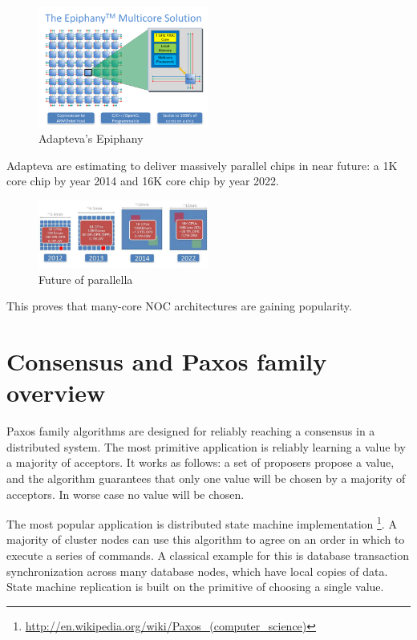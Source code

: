\documentclass[english,11pt]{l4proj}
\begin{document}
\begin{figure}
    \centering
    \includegraphics[width=0.5\textwidth]{images/parallella_64core.png}
    \caption{Adapteva's Epiphany\cite{parallella-kickstarter}}
    \label{fig:epiphany_64}
\end{figure}

Adapteva are estimating to deliver massively parallel chips in near future: a 1K
core chip by year 2014 and 16K core chip by year 2022.

\begin{figure}
    \centering
    \includegraphics[width=0.5\textwidth]{images/parallella_future.jpg}
    \caption{Future of parallella\cite{parallella-kickstarter}}
    \label{fig:parallella_future}
\end{figure}

This proves that many-core NOC architectures are gaining popularity.

\section{Consensus and Paxos family overview}
\label{sec:paxos-family}

Paxos family algorithms are designed for reliably reaching a consensus in a
distributed system. The most primitive application is reliably learning a value
by a majority of acceptors. It works as follows: a set of proposers propose a
value, and the algorithm guarantees that only one value will be chosen by a
majority of acceptors. In worse case no value will be chosen.

The most popular application is distributed state machine implementation
\footnote{\url{http://en.wikipedia.org/wiki/Paxos\_(computer\_science)}}. A
majority of cluster nodes can use this algorithm to agree on an order in which
to execute a series of commands. A classical example for this is database
transaction synchronization across many database nodes, which have local copies
of data. State machine replication is built on the primitive of choosing a
single value.
\end{document}
